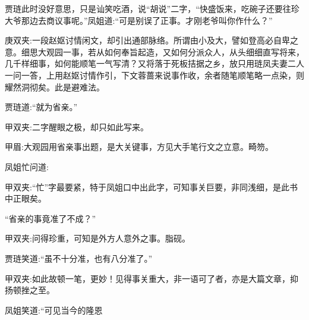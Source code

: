 \begin{parag}
    贾琏此时没好意思，只是讪笑吃酒，说“胡说”二字，“快盛饭来，吃碗子还要往珍大爷那边去商议事呢。”凤姐道:“可是别误了正事。才刚老爷叫你作什么？”\begin{note}庚双夹:一段赵妪讨情闲文，却引出通部脉络。所谓由小及大，譬如登高必自卑之意。细思大观园一事，若从如何奉旨起造，又如何分派众人，从头细细直写将来，几千样细事，如何能顺笔一气写清？又将落于死板拮据之乡，放只用琏凤夫妻二人一问一答，上用赵妪讨情作引，下文蓉蔷来说事作收，余者随笔顺笔略一点染，则耀然洞彻矣。此是避难法。\end{note}贾琏道:“就为省亲。”\begin{note}甲双夹:二字醒眼之极，却只如此写来。\end{note}\begin{note}甲眉:大观园用省亲事出题，是大关键事，方见大手笔行文之立意。畸笏。\end{note}凤姐忙问道:\begin{note}甲双夹:“忙”字最要紧，特于凤姐口中出此字，可知事关巨要，非同浅细，是此书中正眼矣。\end{note}“省亲的事竟准了不成？”\begin{note}甲双夹:问得珍重，可知是外方人意外之事。脂砚。\end{note}贾琏笑道:“虽不十分准，也有八分准了。”\begin{note}甲双夹:如此故顿一笔，更妙！见得事关重大，非一语可了者，亦是大篇文章，抑扬顿挫之至。\end{note}凤姐笑道:“可见当今的隆恩
\end{parag}
